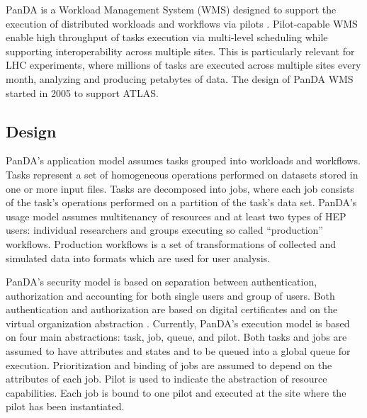 
%
%

PanDA is a Workload Management System (WMS) \cite{marco2009glite} designed to
support the execution of distributed workloads and workflows via pilots
\cite{turilli2017comprehensive}. Pilot-capable WMS enable high throughput of
tasks execution via multi-level scheduling while supporting interoperability
across multiple sites. This is particularly relevant for LHC experiments, where
millions of tasks are executed across multiple sites every month, analyzing
and producing petabytes of data. The design of PanDA WMS started in 2005 to
support ATLAS.

\subsection{Design}
\label{subsec:design}

PanDA's application model assumes tasks grouped into workloads and workflows.
Tasks represent a set of homogeneous operations performed on datasets stored
in one or more input files. Tasks are decomposed into jobs, where each job
consists of the task's operations performed on a partition of the task's data
set. PanDA's usage model assumes multitenancy of resources and at least two
types of HEP users: individual researchers and groups executing so called
``production'' workflows. Production workflows is a set of transformations of
collected and simulated data into formats which are used for user analysis.

PanDA's security model is based on separation between authentication,
authorization and accounting for both single users and group of users. Both
authentication and authorization are based on digital certificates and on the
virtual organization abstraction \cite{foster2001anatomy}. Currently, PanDA's
execution model is based on four main abstractions: task, job, queue, and
pilot. Both tasks and jobs are assumed to have attributes and states and to
be queued into a global queue for execution. Prioritization and binding of
jobs are assumed to depend on the attributes of each job. Pilot is used to
indicate the abstraction of resource capabilities. Each job is bound to one
pilot and executed at the site where the pilot has been instantiated.

